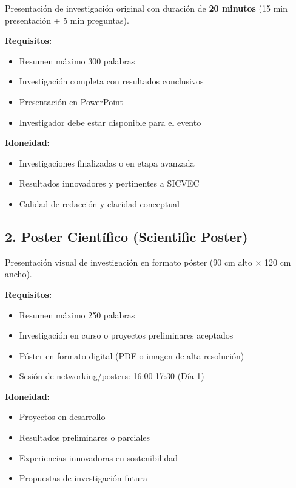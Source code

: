 \documentclass[12pt,a4paper]{article}
\begin{document}
Presentación de investigación original con duración de \textbf{20 minutos} (15 min presentación + 5 min preguntas).

\textbf{Requisitos:}
\begin{itemize}[label={\textcolor{verdeosc}{\checkmark}}]
  \item Resumen máximo 300 palabras
  \item Investigación completa con resultados conclusivos
  \item Presentación en PowerPoint
  \item Investigador debe estar disponible para el evento
\end{itemize}

\textbf{Idoneidad:}
\begin{itemize}
  \item Investigaciones finalizadas o en etapa avanzada
  \item Resultados innovadores y pertinentes a SICVEC
  \item Calidad de redacción y claridad conceptual
\end{itemize}

\subsection{2. Poster Científico (Scientific Poster)}

Presentación visual de investigación en formato póster (90 cm alto × 120 cm ancho).

\textbf{Requisitos:}
\begin{itemize}[label={\textcolor{verdeosc}{\checkmark}}]
  \item Resumen máximo 250 palabras
  \item Investigación en curso o proyectos preliminares aceptados
  \item Póster en formato digital (PDF o imagen de alta resolución)
  \item Sesión de networking/posters: 16:00-17:30 (Día 1)
\end{itemize}

\textbf{Idoneidad:}
\begin{itemize}
  \item Proyectos en desarrollo
  \item Resultados preliminares o parciales
  \item Experiencias innovadoras en sostenibilidad
  \item Propuestas de investigación futura
\end{itemize}
\end{document}
